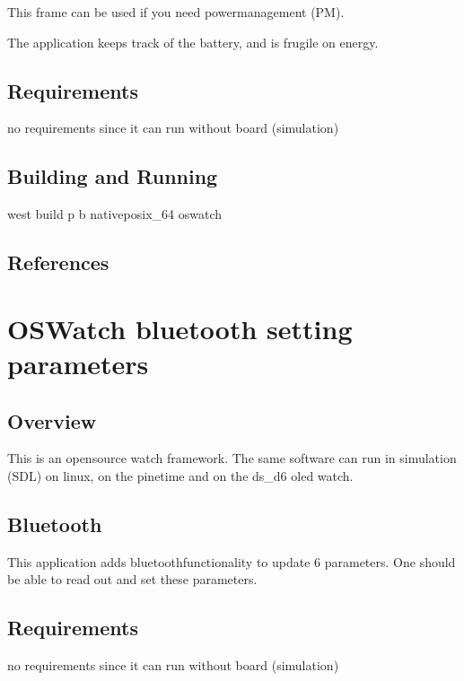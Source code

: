 \documentclass[letterpaper,10pt,english]{sphinxmanual}
\begin{document}
This frame can be used if you need powermanagement (PM).

The application keeps track of the battery, and is frugile on energy.


\subsection{Requirements}
\label{\detokenize{samples/oswatch-batteryREADME:requirements}}
no requirements since it can run without board (simulation)


\subsection{Building and Running}
\label{\detokenize{samples/oswatch-batteryREADME:building-and-running}}
west build \sphinxhyphen{}p \sphinxhyphen{}b  native\sphinxhyphen{}posix\_64 oswatch


\subsection{References}
\label{\detokenize{samples/oswatch-batteryREADME:references}}

\section{OSWatch bluetooth setting parameters}
\label{\detokenize{samples/oswatch-btREADME:oswatch-bluetooth-setting-parameters}}\label{\detokenize{samples/oswatch-btREADME:oswatch}}\label{\detokenize{samples/oswatch-btREADME::doc}}

\subsection{Overview}
\label{\detokenize{samples/oswatch-btREADME:overview}}
This is an opensource watch framework.
The same software can run in simulation (SDL) on linux, on the pinetime and on the ds\_d6 oled watch.


\subsection{Bluetooth}
\label{\detokenize{samples/oswatch-btREADME:bluetooth}}
This application adds bluetoothfunctionality to update 6 parameters.
One should be able to read out and set these parameters.


\subsection{Requirements}
\label{\detokenize{samples/oswatch-btREADME:requirements}}
no requirements since it can run without board (simulation)
\end{document}
